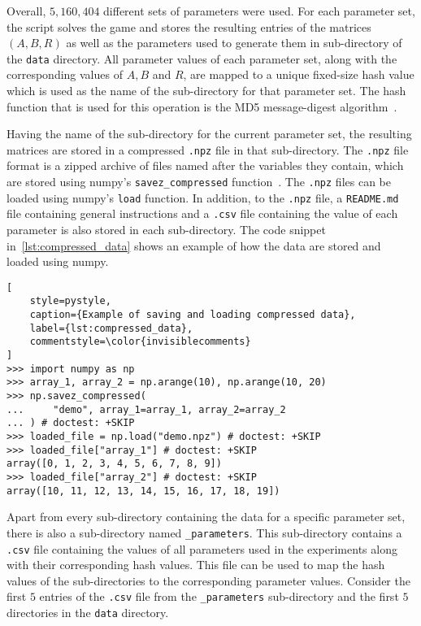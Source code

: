 Overall, \(5,160,404\) different sets of parameters were used.
For each parameter set, the script solves the game and stores the resulting
entries of the matrices \((A, B, R)\) as well as the parameters used to generate
them in sub-directory of the \texttt{data} directory.
All parameter values of each parameter set, along with the corresponding values
of \(A, B\) and \(R\), are mapped to a unique fixed-size hash value which is
used as the name of the sub-directory for that parameter set.
The hash function that is used for this operation is the MD5 message-digest
algorithm~\cite{rivest1992md5}.

Having the name of the sub-directory for the current parameter set, the
resulting matrices are stored in a compressed \texttt{.npz} file in that
sub-directory.
The \texttt{.npz} file format is a zipped archive of files
named after the variables they contain, which are stored using numpy's
\texttt{savez\_compressed} function~\cite{2020NumPy-Array}.
The \texttt{.npz} files can be loaded using numpy's
\texttt{load} function.
In addition, to the \texttt{.npz} file, a
\texttt{README.md} file containing general instructions and a
\texttt{.csv} file containing the value of each parameter is
also stored in each sub-directory.
The code snippet in~\ref{lst:compressed_data} shows an example of how the data
are stored and loaded using numpy.

\begin{lstlisting}[
    style=pystyle,
    caption={Example of saving and loading compressed data},
    label={lst:compressed_data},
    commentstyle=\color{invisiblecomments}
]
>>> import numpy as np
>>> array_1, array_2 = np.arange(10), np.arange(10, 20)
>>> np.savez_compressed(
...     "demo", array_1=array_1, array_2=array_2
... ) # doctest: +SKIP
>>> loaded_file = np.load("demo.npz") # doctest: +SKIP
>>> loaded_file["array_1"] # doctest: +SKIP
array([0, 1, 2, 3, 4, 5, 6, 7, 8, 9])
>>> loaded_file["array_2"] # doctest: +SKIP
array([10, 11, 12, 13, 14, 15, 16, 17, 18, 19])

\end{lstlisting}

Apart from every sub-directory containing the data for a specific parameter set,
there is also a sub-directory named \texttt{\_parameters}.
This sub-directory contains a \texttt{.csv} file containing the
values of all parameters used in the experiments along with their corresponding
hash values.
This file can be used to map the hash values of the sub-directories to the
corresponding parameter values.
Consider the first \(5\) entries of the \texttt{.csv} file
from the \texttt{\_parameters} sub-directory and the first
\(5\) directories in the \texttt{data} directory.

